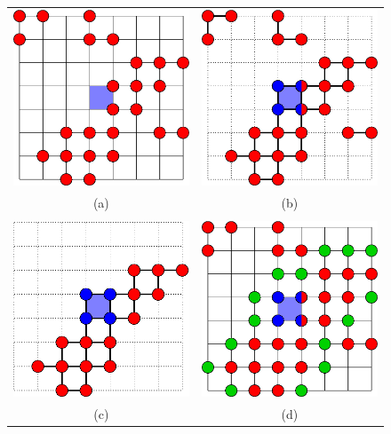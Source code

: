 \begin{figure}[t]
\centering

\begin{tabular}{cc}
\includegraphics[width=0.4\linewidth]{images/undefined_grad_7x7x7.eps} \qquad &
\qquad
\includegraphics[width=0.4\linewidth]{images/ugrad_graph_7x7x7.eps} \\
(a) & (b) \\
\\
\includegraphics[width=0.4\linewidth]{images/ugrad_component_7x7x7.eps} \qquad &
\qquad
\includegraphics[width=0.4\linewidth]{images/selected_grad_7x7x7.eps} \\
(c) & (d) \\
\end{tabular}


\end{figure}
